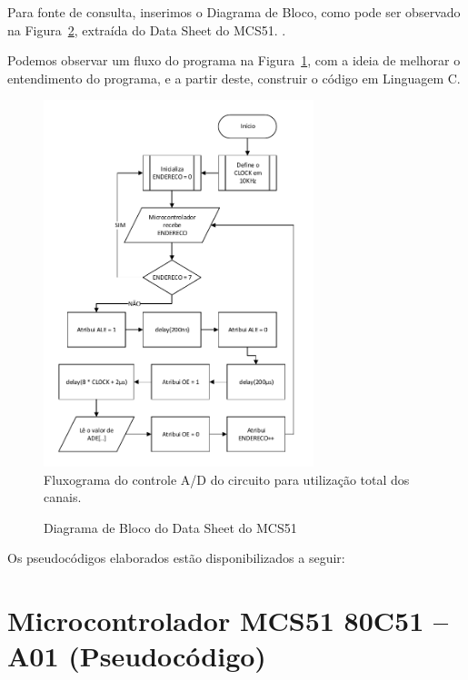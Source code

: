 \documentclass[
	12pt,				%
	openright,			%
  oneside,     %
	a4paper,			%
	english,			%
	french,				%
	spanish,			%
	brazil				%
	]{abntex2}
\begin{document}
Para fonte de consulta, inserimos o Diagrama de Bloco, como pode ser observado na Figura~\ref{fig:datasheet-cap1-2}, extraída do Data Sheet do MCS51. \cite{Corporation2000}.

Podemos observar um fluxo do programa na Figura~\ref{fig:cha-1-fluxograma}, com a ideia de melhorar o entendimento do programa, e a partir deste, construir o código em Linguagem C.

\begin{figure}[H]
  \centering  
  \caption{\label{fig:cha-1-fluxograma}Fluxograma do controle A/D do circuito para utilização total dos canais.}
  \includegraphics[width=0.7\textwidth]{images/Atividade01/Fluxograma.pdf}
\end{figure}

\newpage

  \begin{figure}[H]
    \centering
    
    \caption{\label{fig:datasheet-cap1-2}Diagrama de Bloco do Data Sheet do MCS51}
  \end{figure}

\newpage

Os pseudocódigos elaborados estão disponibilizados a seguir:

\section*{Microcontrolador MCS51 80C51 -- A01 (Pseudocódigo)}
\end{document}
